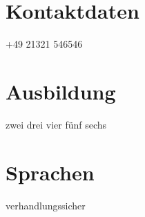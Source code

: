 \documentclass[11pt, a4paper] {moderncv}
\begin{document}
\maketitle

\section{Kontaktdaten}
\cvline{\mobilesymbol} {+49 21321 546546}

\section{Ausbildung}
 {zwei} {drei} {vier} {f\"unf} {sechs}

\section{Sprachen}
 {verhandlungssicher}
\end{document}
